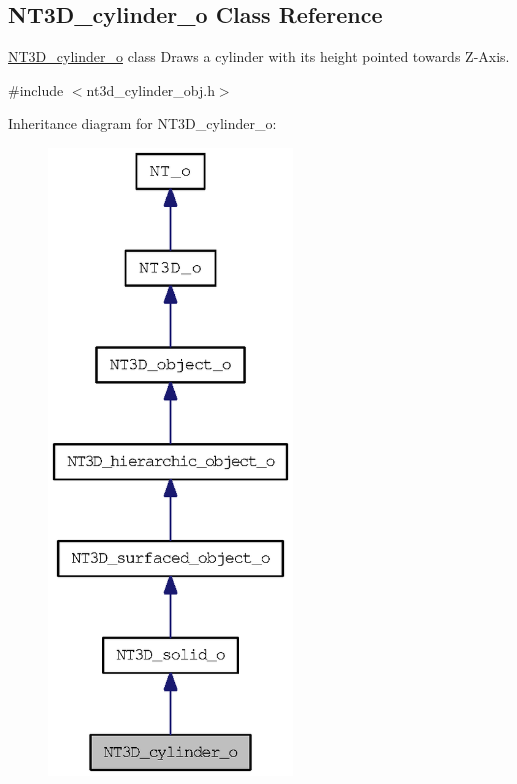 \subsection{NT3D\_\-cylinder\_\-o Class Reference}
\label{class_n_t3_d__cylinder__o}


\hyperlink{class_n_t3_d__cylinder__o}{NT3D\_\-cylinder\_\-o} class Draws a cylinder with its height pointed towards Z-\/Axis.  




{\ttfamily \#include $<$nt3d\_\-cylinder\_\-obj.h$>$}



Inheritance diagram for NT3D\_\-cylinder\_\-o:
\nopagebreak
\begin{figure}[H]
\begin{center}
\leavevmode
\includegraphics[width=184pt]{class_n_t3_d__cylinder__o__inherit__graph}
\end{center}
\end{figure}


